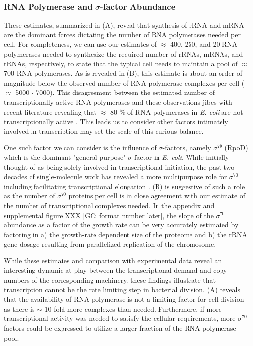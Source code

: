 \subsubsection{RNA Polymerase and $\sigma$-factor Abundance} 
These estimates, summarized in  (A), reveal that synthesis
of rRNA  and mRNA are the dominant forces dictating the number of RNA polymerases needed
per cell. For completeness, we can use our estimates of $\approx$ 400, 250,
and 20 RNA polymerases needed to synthesize the required number of rRNAs,
mRNAs, and tRNAs, respectively, to state that the typical cell needs to
maintain a pool of $\approx$ 700 RNA polymerases. As is revealed in
 (B), this estimate is about an order
of magnitude below the observed number of RNA polymerase complexes per cell
($\approx$ 5000 - 7000). This disagreement between the estimated number of transcriptionally active RNA
polymerases and these observations jibes with recent literature revealing that
$\approx$ 80 \% of RNA polymerases in \textit{E. coli} are not transcriptionally
active \citep{patrick2015}. This leads us to consider other factors intimately
involved in transcription may set the scale of this curious balance. 

One such factor we can consider is the influence of $\sigma$-factors, namely
$\sigma^{70}$ (RpoD) which is the dominant "general-purpose" $\sigma$-factor
in \textit{E. coli}. While initially thought of as being solely involved in
transcriptional initiation, the past two decades of single-molecule
work has revealed a more multipurpose role for $\sigma^{70}$
including facilitating transcriptional elongation \citep{kapanidis2005,
goldman2015, perdue2011,mooney2003,mooney2005}.  (B) is
suggestive of such a role as the number of $\sigma^{70}$ proteins per cell is in
close agreement with our estimate of the number of transcriptional complexes
needed. In the appendix and supplemental figure XXX [GC: format number later],
the slope of the $\sigma^{70}$ abundance as a factor of the growth rate can be
very accurately estimated by factoring in a) the growth-rate dependent size of
the proteome and b) the rRNA gene dosage resulting from parallelized replication
of the chromosome. 

While these estimates and comparison with experimental data reveal an
interesting dynamic at play between the transcriptional demand and copy numbers
of the corresponding machinery, these findings illustrate that transcription cannot be the
rate limiting step in bacterial division.  (A) reveals that
the availability of RNA polymerase is not a limiting factor for cell division as there is $\sim$ 10-fold
more complexes than needed. Furthermore, if more transcriptional activity was
needed to satisfy the cellular requirements, more $\sigma^{70}$-factors could be
expressed to utilize a larger fraction of the RNA polymerase pool. 
